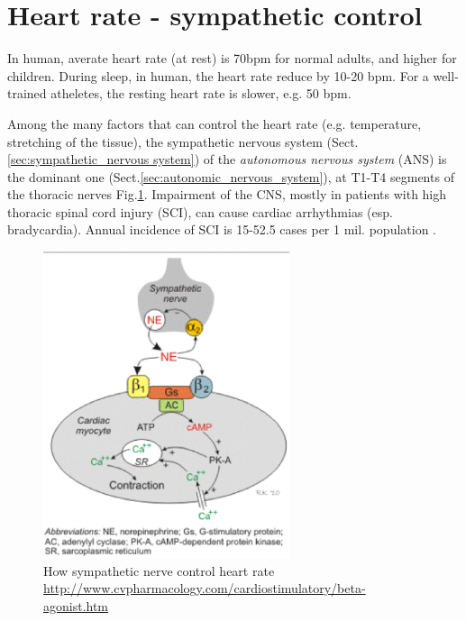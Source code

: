 \section{Heart rate - sympathetic control}
\label{sec:sympathetic_control-heart-rate}
\label{sec:heart-rate}

In human, averate heart rate (at rest) is 70bpm for normal adults, and higher
for children. During sleep, in human, the heart rate reduce by 10-20 bpm.
For a well-trained atheletes, the resting heart rate is slower, e.g. 50 bpm.

Among the many factors that can control the heart rate (e.g.
temperature, stretching of the tissue), the sympathetic nervous system
(Sect.\ref{sec:sympathetic_nervous system}) of the {\it autonomous nervous
system} (ANS) is the dominant one (Sect.\ref{sec:autonomic_nervous_system}), at
T1-T4 segments of the thoracic nerves Fig.\ref{fig:sympathetic_nerve_cardiac}.
Impairment of the CNS, mostly in patients with high thoracic spinal cord injury
(SCI), can cause cardiac arrhythmias (esp. bradycardia). Annual incidence of SCI
is 15-52.5 cases per 1 mil. population \citep{grigorean2009}.

\begin{figure}[hbt]
  \centerline{\includegraphics[height=9cm,
    angle=0]{./images/sympathetic_nerve_cardiac.eps}}
  \caption{How sympathetic nerve control heart rate
  \url{http://www.cvpharmacology.com/cardiostimulatory/beta-agonist.htm}}
  \label{fig:sympathetic_nerve_cardiac}
\end{figure}

